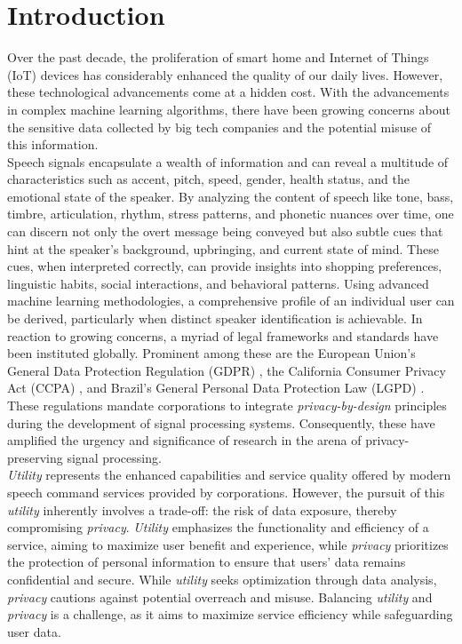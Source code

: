 \chapter{Introduction}

Over the past decade, the proliferation of smart home and Internet of Things (IoT) devices has considerably enhanced the quality of our daily lives. However, these technological advancements come at a hidden cost. With the advancements in complex machine learning algorithms, there have been growing concerns about the sensitive data collected by big tech companies and the potential misuse of this information.\\
Speech signals encapsulate a wealth of information and can reveal a multitude of characteristics such as accent, pitch, speed, gender, health status, and the emotional state of the speaker. By analyzing the content of speech like tone, bass, timbre, articulation, rhythm, stress patterns, and phonetic nuances over time, one can discern not only the overt message being conveyed but also subtle cues that hint at the speaker's background, upbringing, and current state of mind. These cues, when interpreted correctly, can provide insights into shopping preferences, linguistic habits, social interactions, and behavioral patterns. Using advanced machine learning methodologies, a comprehensive profile of an individual user can be derived, particularly when distinct speaker identification is achievable.
In reaction to growing concerns, a myriad of legal frameworks and standards have been instituted globally. Prominent among these are the European Union’s General Data Protection Regulation (GDPR) \cite{gdpr}, the California Consumer Privacy Act (CCPA) \cite{ccpa}, and Brazil’s General Personal Data Protection Law (LGPD) \cite{lgpd}. These regulations mandate corporations to integrate \textit{privacy-by-design} principles during the development of signal processing systems. Consequently,  these have amplified the urgency and significance of research in the arena of privacy-preserving signal processing.\\



\textit{Utility} represents the enhanced capabilities and service quality offered by modern speech command services provided by corporations. However, the pursuit of this \textit{utility} inherently involves a trade-off: the risk of data exposure, thereby compromising \textit{privacy}. \textit{Utility} emphasizes the functionality and efficiency of a service, aiming to maximize user benefit and experience, while \textit{privacy} prioritizes the protection of personal information to ensure that users' data remains confidential and secure. While \textit{utility} seeks optimization through data analysis, \textit{privacy} cautions against potential overreach and misuse. Balancing \textit{utility} and \textit{privacy} is a challenge, as it aims to maximize service efficiency while safeguarding user data.\\

